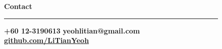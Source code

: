 \documentclass[a4paper, 10pt]{article}
\newcommand{\lhsWidth}{0.3\textwidth}
\begin{document}
\AddToShipoutPictureBG{
  \AtPageLowerLeft{%
    \color{lhsBgCol}%
    \rule{\dimexpr0.3\pdfpagewidth+0.2in}{\dimexpr\pdfpageheight}%
  }
}

\begin{figure}[h]

\color{white}
\begin{minipage}[t][\paperheight][t]{\lhsWidth}
	{\large \textbf{Contact}} \newline
	\rule [6pt]{\linewidth}{1pt}
	\vspace{-15pt}
	\newline \vspace{3pt}
	\faPhone \hspace{3pt} \textbf{+60 12-3190613}
	\newline \vspace{3pt}
	\faEnvelope \hspace{3pt} \textbf{yeohlitian@gmail.com}
	\newline \vspace{3pt}
	\faGithub \hspace{3pt} \textbf{\href{https://github.com/LiTianYeoh}{github.com/LiTianYeoh}}

	\vspace{3em}


\end{minipage}
\end{figure}
\end{document}
